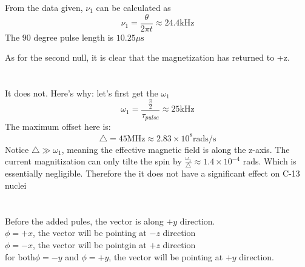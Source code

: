 \documentclass[11pt]{article}
\begin{document}
From the data given, $\nu_1$ can be calculated as 
\[
    \nu_1 = \frac{\theta}{2 \pi t} \approx 24.4 \text{kHz}
\]
The $90$ degree pulse length is $10.25 \mu \text{s}$

As for the second null, it is clear that the magnetization has returned to +z.

\section{}
It does not. Here's why:
let's first get the $\omega_1$
    \[
        \omega_1 = \frac{\frac{\pi}{2}}{\tau_{pulse}} \approx 25 \text{kHz}
    \]
    The maximum offset here is:
    \[
        \triangle = 45 \text{MHz} \approx 2.83 \times 10^8 \text{rads/s}
    \]
    Notice $\triangle \gg \omega_1$, meaning the effective magnetic field is along the z-axis. The current magnitization can only tilte the spin by $\frac{\omega_1}{\triangle} \approx 1.4 \times 10^{-4}$ rads. Which is essentially negligible. Therefore the it does not have a significant effect on C-13 nuclei

\section{}
Before the added pules, the vector is along $+y$ direction. \\
$\phi = +x$, the vector will be pointing at $-z$ direction\\
$\phi = -x$, the vector will be pointgin at $+z$ direction\\
for both$\phi = -y$ and $\phi = +y$, the vector will be pointing at $+y$ direction. \\

\end{document}
